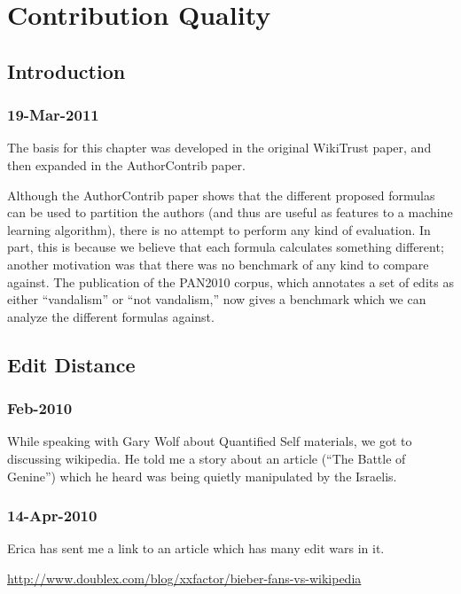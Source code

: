 \chapter{Contribution Quality}

\section{Introduction}

\subsection{19-Mar-2011}

The basis for this chapter was developed in the original
WikiTrust paper, and then expanded in the AuthorContrib
paper.

Although the AuthorContrib paper shows that the different
proposed formulas can be used to partition the authors
(and thus are useful as features to a machine learning algorithm),
there is no attempt to perform any kind of evaluation.
In part, this is because we believe that each formula calculates
something different; another motivation was that there was
no benchmark of any kind to compare against.
The publication of the PAN2010 corpus, which annotates a set
of edits as either ``vandalism'' or ``not vandalism,''
now gives a benchmark which we can analyze the different
formulas against.


\section{Edit Distance}

\subsection{Feb-2010}

While speaking with Gary Wolf about Quantified Self materials,
we got to discussing wikipedia.
He told me a story about an article
(``The Battle of Genine'')
which he heard was being quietly manipulated by the Israelis.

\subsection{14-Apr-2010}

Erica has sent me a link to an article which has many edit
wars in it.

\url{http://www.doublex.com/blog/xxfactor/bieber-fans-vs-wikipedia}


